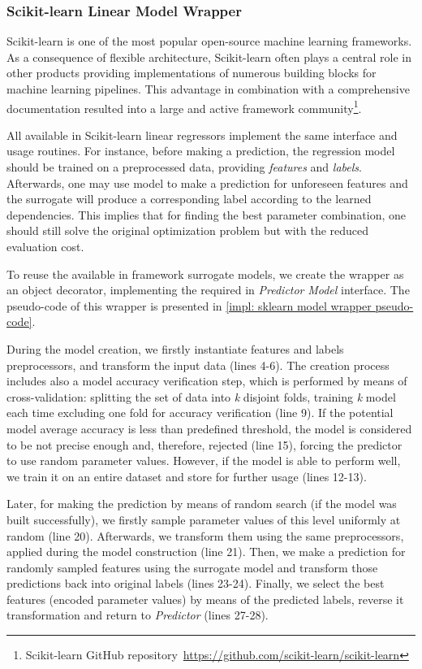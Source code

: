 \subsubsection{Scikit-learn Linear Model Wrapper}\label{impl: sklearn wrapper}
Scikit-learn is one of the most popular open-source machine learning frameworks. As a consequence of flexible architecture, Scikit-learn often plays a central role in other products providing implementations of numerous building blocks for machine learning pipelines. This advantage in combination with a comprehensive documentation resulted into a large and active framework community\footnote{Scikit-learn GitHub repository~\url{https://github.com/scikit-learn/scikit-learn}}.

All available in Scikit-learn linear regressors implement the same interface and usage routines. For instance, before making a prediction, the regression model should be trained on a preprocessed data, providing \emph{features} and \emph{labels}. Afterwards, one may use model to make a prediction for unforeseen features and the surrogate will produce a corresponding label according to the learned dependencies. This implies that for finding the best parameter combination, one should still solve the original optimization problem but with the reduced evaluation cost.

To reuse the available in framework surrogate models, we create the wrapper as an object decorator, implementing the required in \emph{Predictor} \emph{Model} interface. The pseudo-code of this wrapper is presented in \cref{impl: sklearn model wrapper pseudo-code}.

During the model creation, we firstly instantiate features and labels preprocessors, and transform the input data (lines 4-6). The creation process includes also a model accuracy verification step, which is performed by means of cross-validation: splitting the set of data into \textit{k} disjoint folds, training \textit{k} model each time excluding one fold for accuracy verification (line 9). If the potential model average accuracy is less than predefined threshold, the model is considered to be not precise enough and, therefore, rejected (line 15), forcing the predictor to use random parameter values. However, if the model is able to perform well, we train it on an entire dataset and store for further usage (lines 12-13).

Later, for making the prediction by means of random search (if the model was built successfully), we firstly sample parameter values of this level uniformly at random (line 20). Afterwards, we transform them using the same preprocessors, applied during the model construction (line 21). Then, we make a prediction for randomly sampled features using the surrogate model and transform those predictions back into original labels (lines 23-24). Finally, we select the best features (encoded parameter values) by means of the predicted labels, reverse it transformation and return to \emph{Predictor} (lines 27-28).

